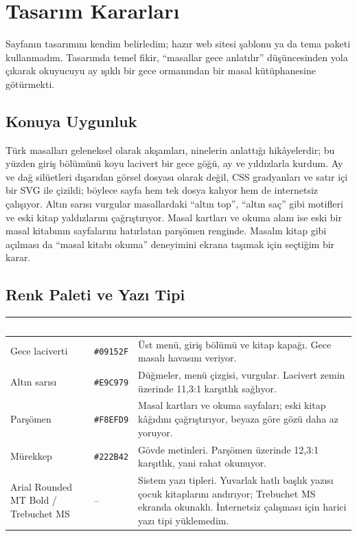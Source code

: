 \documentclass[12pt,a4paper]{article}
\begin{document}
\section{Tasarım Kararları}
Sayfanın tasarımını kendim belirledim; hazır web sitesi şablonu ya da tema paketi
kullanmadım. Tasarımda temel fikir, ``masallar gece anlatılır'' düşüncesinden yola çıkarak
okuyucuyu ay ışıklı bir gece ormanından bir masal kütüphanesine götürmekti.

\subsection{Konuya Uygunluk}
Türk masalları geleneksel olarak akşamları, ninelerin anlattığı hikâyelerdir; bu yüzden
giriş bölümünü koyu lacivert bir gece göğü, ay ve yıldızlarla kurdum. Ay ve dağ silüetleri
dışarıdan görsel dosyası olarak değil, CSS gradyanları ve satır içi bir SVG ile çizildi;
böylece sayfa hem tek dosya kalıyor hem de internetsiz çalışıyor. Altın sarısı vurgular
masallardaki ``altın top'', ``altın saç'' gibi motifleri ve eski kitap yaldızlarını
çağrıştırıyor. Masal kartları ve okuma alanı ise eski bir masal kitabının sayfalarını
hatırlatan parşömen renginde. Masalın kitap gibi açılması da ``masal kitabı okuma''
deneyimini ekrana taşımak için seçtiğim bir karar.

\subsection{Renk Paleti ve Yazı Tipi}
\begin{center}
\begin{tabular}{@{}llp{6.4cm}@{}}
\toprule
\rowcolor{ana}\textcolor{white}{\textbf{Ad}} & \textcolor{white}{\textbf{Kod}} & \textcolor{white}{\textbf{Nerede / neden kullandınız?}} \\
\midrule
Gece laciverti & \texttt{\#09152F} & Üst menü, giriş bölümü ve kitap kapağı. Gece masalı havasını veriyor. \\
Altın sarısı & \texttt{\#E9C979} & Düğmeler, menü çizgisi, vurgular. Lacivert zemin üzerinde 11,3:1 karşıtlık sağlıyor. \\
Parşömen & \texttt{\#F8EFD9} & Masal kartları ve okuma sayfaları; eski kitap kâğıdını çağrıştırıyor, beyaza göre gözü daha az yoruyor. \\
Mürekkep & \texttt{\#222B42} & Gövde metinleri. Parşömen üzerinde 12,3:1 karşıtlık, yani rahat okunuyor. \\
Arial Rounded MT Bold / Trebuchet MS & -- & Sistem yazı tipleri. Yuvarlak hatlı başlık yazısı çocuk kitaplarını andırıyor; Trebuchet MS ekranda okunaklı. İnternetsiz çalışması için harici yazı tipi yüklemedim. \\
\bottomrule
\end{tabular}
\end{center}
\end{document}
